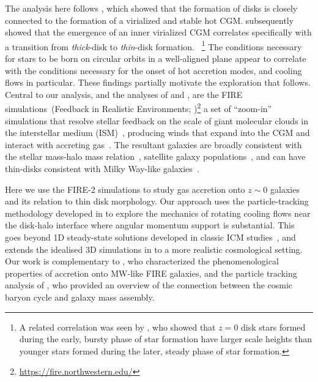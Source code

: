 \documentclass[fleqn,usenatbib]{mnras}
\begin{document}
The analysis here follows \cite{Stern2021}, which showed that the formation of disks is closely connected to the formation of a virialized and stable hot CGM.
\cite{Yu2021} subsequently showed that the emergence of an inner virialized CGM correlates specifically with a transition from {\em thick}-disk to {\em thin}-disk formation.
~\footnote{ A related correlation was seen by \citealt{Ma2017a}, who showed that $z=0$ disk stars formed during the early, bursty phase of star formation have larger scale heights than younger stars formed during the later, steady phase of star formation.}
The conditions necessary for stars to be born on circular orbits in a well-aligned plane appear to correlate with the conditions necessary for the onset of hot accretion modes, and cooling flows in particular.
These findings partially motivate the exploration that follows.
Central to our analysis, and the analyses of \citeauthor{Stern2021} and \citeauthor{Yu2021}, are the FIRE simulations~(Feedback in Realistic Environments; \citealt{Hopkins2014, Hopkins2018})\footnote{\url{https://fire.northwestern.edu/}} a set of ``zoom-in'' simulations that resolve stellar feedback on the scale of giant molecular clouds in the interstellar medium (ISM)~\citep{Guszejnov2020b, Benincasa2020}, producing winds that expand into the CGM and interact with accreting gas~\citep{Muratov2015, Muratov2017, Angles-Alcazar2017, Hafen2019, Hafen2020, Pandya2021}.
The resultant galaxies are broadly consistent with the stellar mass-halo mass relation~\citep{Hopkins2017}, satellite galaxy populations~\citep{Wetzel2016, Garrison-Kimmel2019a, Samuel2020}, and can have thin-disks consistent with Milky Way-like galaxies~\citep{Ma2017a, Garrison-Kimmel2018, El-Badry2018, Sanderson2020, Yu2021}.

Here we use the FIRE-2 simulations to study gas accretion onto $z\sim0$ galaxies and its relation to thin disk morphology.
Our approach uses the particle-tracking methodology developed in \citet{Hafen2019, Hafen2020} to explore the mechanics of rotating cooling flows near the disk-halo interface where angular momentum support is substantial.
This goes beyond 1D steady-state solutions developed in classic ICM studies~\citep[e.g.][]{Cowie1980}, and extends the idealised 3D simulations in \cite{Stern2019} to a more realistic cosmological setting. 
Our work is complementary to \citet{Trapp2021}, who characterized the phenomenological properties of accretion onto MW-like FIRE galaxies, and the particle tracking analysis of \cite{Angles-Alcazar2017}, who provided an overview of the connection between the cosmic baryon cycle and galaxy mass assembly. 
\end{document}
